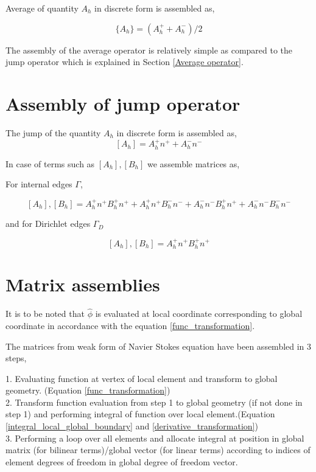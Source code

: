 \documentclass[a4paper]{book}
\begin{document}
Average of quantity $A_h$ in discrete form is assembled as,

\begin{equation}\label{Average operator}
\lbrace A_h \rbrace = (A_h^+ + A_h^-)/2
\end{equation}

The assembly of the average operator is relatively simple as compared to the jump operator which is explained in Section \ref{Average operator}.

\section{Assembly of jump operator} \label{Jump operator}

The jump of the quantity $A_h$ in discrete form is assembled as,
\begin{equation} \label{Jump_operator}
[A_h] = A_h^+ n^+ + A_h^- n^-
\end{equation}

In case of terms such as $[A_h],[B_h]$ we assemble matrices as, 

For internal edges $\Gamma$,

\begin{equation} \label{Jump operator L2}
[A_h],[B_h] = A_h^+ n^+ B_h^+ n^+ + A_h^+ n^+ B_h^- n^- + A_h^- n^- B_h^+ n^+ + A_h^- n^- B_h^- n^-
\end{equation}

and for Dirichlet edges $\Gamma_D$

\begin{equation} \label{Jump operator L2 for dirichlet}
[A_h],[B_h] = A_h^+ n^+ B_h^+ n^+ 
\end{equation}


\section{Matrix assemblies} \label{matrix_assembly_ch4}

It is to be noted that $\hat{\phi}$ is evaluated at local coordinate corresponding to global coordinate in accordance with the equation \ref{func_transformation}.

The matrices from weak form of Navier Stokes equation have been assembled in 3 steps,

1. Evaluating function at vertex of local element and transform to global geometry. (Equation \ref{func_transformation})\\
2. Transform function evaluation from step 1 to global geometry (if not done in step 1) and performing integral of function over local element.(Equation \ref{integral_local_global_boundary} and \ref{derivative_transformation})\\
3. Performing a loop over all elements and allocate integral at position in global matrix (for bilinear terms)/global vector (for linear terms) according to indices of element degrees of freedom in global degree of freedom vector.\\
\end{document}

